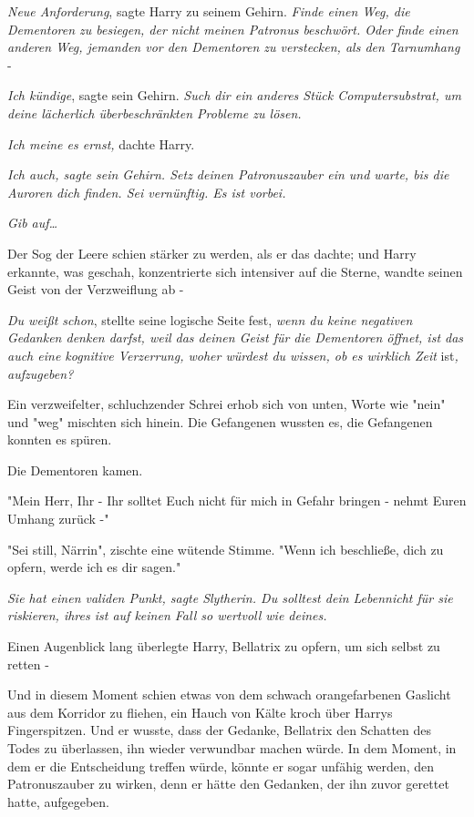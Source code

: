 {\emph{Neue Anforderung}, sagte Harry zu seinem Gehirn. \emph{Finde einen Weg, die Dementoren zu besiegen, der nicht meinen Patronus beschwört. Oder finde einen anderen Weg, jemanden vor den Dementoren zu verstecken, als den Tarnumhang} -

\emph{Ich kündige}, sagte sein Gehirn. \emph{Such dir ein anderes Stück Computersubstrat, um deine lächerlich überbeschränkten Probleme zu lösen.}

\emph{Ich meine es ernst,} dachte Harry.

\emph{\emph{Ich auch}, sagte sein Gehirn. \emph{Setz deinen} \emph{Patronuszauber} \emph{ein und warte, bis die Auroren dich finden. Sei vernünftig. Es ist vorbei.}}

\emph{\emph{Gib auf…}}

Der Sog der Leere schien stärker zu werden, als er das dachte; und Harry erkannte, was geschah, konzentrierte sich intensiver auf die Sterne, wandte seinen Geist von der Verzweiflung ab -

\emph{Du weißt schon}, stellte seine logische Seite fest, \emph{wenn du keine negativen Gedanken denken darfst, weil das deinen Geist für die Dementoren öffnet, ist das auch eine kognitive Verzerrung, woher würdest du wissen, ob es wirklich Zeit} ist\emph{, aufzugeben?}

Ein verzweifelter, schluchzender Schrei erhob sich von unten, Worte wie "nein" und "weg" mischten sich hinein. Die Gefangenen wussten es, die Gefangenen konnten es spüren.

Die Dementoren kamen.

"Mein Herr, Ihr - Ihr solltet Euch nicht für mich in Gefahr bringen - nehmt Euren Umhang zurück -"

"Sei still, Närrin", zischte eine wütende Stimme. "Wenn ich beschließe, dich zu opfern, werde ich es dir sagen."

\emph{\emph{Sie hat einen validen Punkt}, sagte Slytherin. \emph{Du solltest} \emph{dein Leben}nicht \emph{für sie riskieren, ihres} \emph{ist auf keinen Fall so wertvoll wie deines.}}

Einen Augenblick lang überlegte Harry, Bellatrix zu opfern, um sich selbst zu retten -

Und in diesem Moment schien etwas von dem schwach orangefarbenen Gaslicht aus dem Korridor zu fliehen, ein Hauch von Kälte kroch über Harrys Fingerspitzen. Und er wusste, dass der Gedanke, Bellatrix den Schatten des Todes zu überlassen, ihn wieder verwundbar machen würde. In dem Moment, in dem er die Entscheidung treffen würde, könnte er sogar unfähig werden, den Patronuszauber zu wirken, denn er hätte den Gedanken, der ihn zuvor gerettet hatte, aufgegeben.

}
